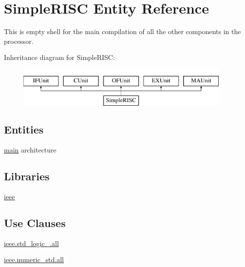 \hypertarget{class_simple_r_i_s_c}{\section{Simple\-R\-I\-S\-C Entity Reference}
\label{class_simple_r_i_s_c}
}


This is empty shell for the main compilation of all the other components in the processor.  


Inheritance diagram for Simple\-R\-I\-S\-C\-:\begin{figure}[H]
\begin{center}
\leavevmode
\includegraphics[height=2.000000cm]{class_simple_r_i_s_c}
\end{center}
\end{figure}
\subsection*{Entities}
\begin{DoxyCompactItemize}
\item 
\hyperlink{class_simple_r_i_s_c_1_1main}{main} architecture
\end{DoxyCompactItemize}
\subsection*{Libraries}
 \begin{DoxyCompactItemize}
\item 
\hypertarget{class_simple_r_i_s_c_a0a6af6eef40212dbaf130d57ce711256}{\hyperlink{class_simple_r_i_s_c_a0a6af6eef40212dbaf130d57ce711256}{ieee} }\label{class_simple_r_i_s_c_a0a6af6eef40212dbaf130d57ce711256}

\end{DoxyCompactItemize}
\subsection*{Use Clauses}
 \begin{DoxyCompactItemize}
\item 
\hypertarget{class_simple_r_i_s_c_a43ecb358105806229eb7a3074fc4d577}{\hyperlink{class_simple_r_i_s_c_a43ecb358105806229eb7a3074fc4d577}{ieee.\-std\-\_\-logic\-\_.\-all}   }\label{class_simple_r_i_s_c_a43ecb358105806229eb7a3074fc4d577}

\item 
\hypertarget{class_simple_r_i_s_c_a631689596594b2068e0ee8dadd0931fe}{\hyperlink{class_simple_r_i_s_c_a631689596594b2068e0ee8dadd0931fe}{ieee.\-numeric\-\_\-std.\-all}   }\label{class_simple_r_i_s_c_a631689596594b2068e0ee8dadd0931fe}

\end{DoxyCompactItemize}


